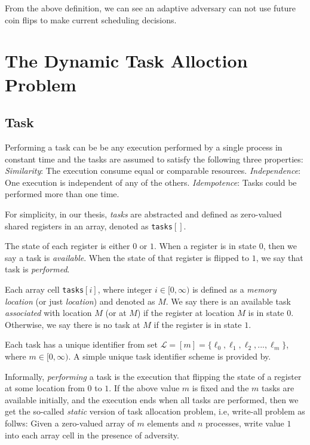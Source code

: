 From the above definition, we can see an adaptive adversary can not use
future coin flips to make current scheduling decisions.

\section{The Dynamic Task Alloction Problem}


\subsection{Task}
Performing a task can be be any execution performed by a single
process in constant time and the tasks are assumed to satisfy the following three
properties\cite{georgiou2007all}:
\emph{Similarity}: The execution consume equal or comparable resources.
\emph{Independence}: One execution is independent of any of the others.
\emph{Idempotence}: Tasks could be performed more than one time.

For simplicity, in our thesis, \emph{tasks} are abstracted and defined as zero-valued shared registers
in an array, denoted as \texttt{tasks}$[ ]$.

The state of each register is either $0$ or $1$. When a register is in state $0$,
then we say a task is \emph{available}. When the
state of that register is flipped to $1$, we say that task is \emph{performed}.

Each array cell \texttt{tasks}$[i]$, where
integer $i \in [0, \infty)$ is defined as a \emph{memory location} (or just \emph{location}) and denoted as $M$.
We say there is an available task \emph{associated} with location $M$ (or at $M$)
if the register at location $M$ is in state $0$.
Otherwise, we say there is no task at $M$ if the register is in state $1$.

Each task has a unique identifier from set
$\mathcal{L} = [m] = \{\ell_0, \ell_1, \ell_2,..., \ell_m\}$, where $m \in [0, \infty)$.
A simple unique task identifier scheme is provided by\cite{alistarh2014dynamic}.

Informally, \emph{performing} a task is the execution that flipping the state of a register at some location from
$0$ to $1$. If the above value $m$ is fixed and the $m$ tasks are available initially,
and the execution ends when all tasks are performed, then we get the so-called \emph{static} version of task allocation problem,
i.e, write-all problem as follws: Given a zero-valued array of $m$ elements and $n$ processes,
write value $1$ into each array cell in the presence of adversity\cite{kanellakis1992efficient}.

